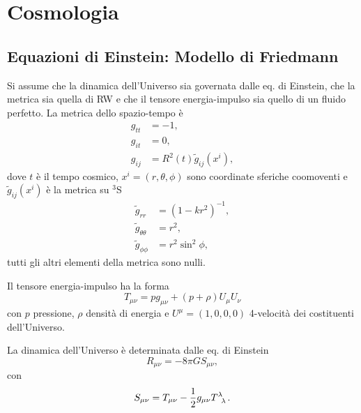 \chapter{Cosmologia}
\label{cha:cosmologia}

\section{Equazioni di Einstein: Modello di Friedmann}

Si assume che la dinamica dell'Universo sia governata dalle eq. di Einstein, che
la metrica sia quella di RW e che il tensore energia-impulso sia quello di un
fluido perfetto.  La metrica dello spazio-tempo è
\begin{subequations}
  \label{rw1}
  \begin{align}
    g_{tt} &=-1, \\
    g_{it} &= 0, \\
    g_{ij} &= R^2(t) \tilde{g}_{ij}(x^i),
  \end{align}
\end{subequations}
dove $t$ è il tempo cosmico, $x^{i} = (r,\theta,\phi)$ sono coordinate sferiche
coomoventi e $\tilde{g}_{ij}(x^i)$ è la metrica su $^{3}$S
\begin{subequations}
  \label{rw2}
  \begin{align}
    \tilde{g}_{rr} &= (1-kr^2)^{-1}, \\
    \tilde{g}_{\theta \theta} &= r^2, \\
    \tilde{g}_{\phi \phi} &= r^2 \sin^2 \phi,
  \end{align}
\end{subequations}
tutti gli altri elementi della metrica sono nulli.

Il tensore energia-impulso ha la forma
\begin{equation}
  T_{\mu\nu} = p g_{\mu\nu} + (p+\rho) U_{\mu} U_{\nu}
  \label{fp}
\end{equation}
con $p$ pressione, $\rho$ densità di energia e $U^{\mu}=(1,0,0,0)$ 4-velocità
dei costituenti dell'Universo.

La dinamica dell'Universo è determinata dalle eq. di Einstein
\begin{equation}
  R_{\mu\nu} =-8\pi GS_{\mu \nu},
\end{equation}
con
\begin{equation}
  S_{\mu \nu}=T_{\mu \nu}-\frac{1}{2} g_{\mu \nu} \tensor{T}{^{\lambda}_{\lambda}}.
\end{equation}

